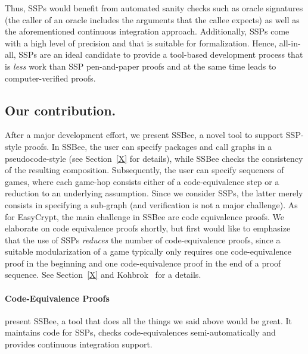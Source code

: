 Thus, SSPs would benefit from automated sanity checks such as oracle signatures
(the caller of an oracle includes the arguments that the callee expects) as
well as the aforementioned continuous integration approach.
Additionally, SSPs come with a high level of precision and
that is suitable for formalization. Hence, all-in-all, SSPs are an ideal
candidate to provide a tool-based development process
that is \emph{less} work than SSP pen-and-paper proofs %
and at the same time leads to computer-verified proofs.


\subsection{Our contribution.} After a major development effort,
we present SSBee, a novel tool to support SSP-style proofs. 
In SSBee, the user can specify packages and call graphs in a 
pseudocode-style (see Section~\ref{X} for details), while SSBee
checks the consistency of the resulting composition. Subsequently,
the user can specify sequences of games, where each game-hop consists
either of a code-equivalence step or a reduction to an underlying
assumption. Since we consider SSPs, the latter merely consists in
specifying a sub-graph (and verification is not a major challenge).
As for EasyCrypt, the main challenge in SSBee are code equivalence proofs.
We elaborate on code equivalence proofs shortly, but first would
like to emphasize that the use of SSPs \emph{reduces} the number
of code-equivalence proofs, since a suitable modularization of a game
typically only requires one code-equivalence proof in the beginning
and one code-equivalence proof in the end of a proof sequence.
See Section~\ref{X} and Kohbrok~\cite{Kohbrok:thesis} for a details.

\paragraph{Code-Equivalence Proofs}






present SSBee, a tool that does all the things
we said above would be great. It maintains code for SSPs, checks code-equivalences
semi-automatically and provides continuous integration support.

